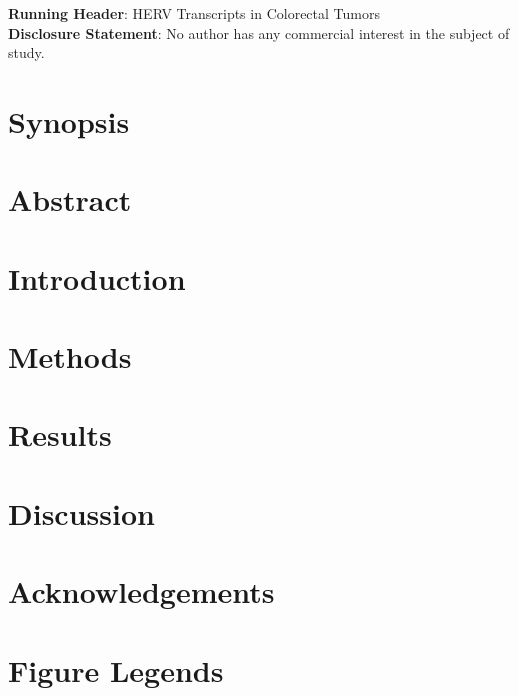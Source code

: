 \documentclass[11pt,letterpaper]{article}  %
\makeatletter
\renewcommand{\maketitle}{
        \begingroup
            \setlength{\parindent}{0pt}
            \begin{flushleft}
                \LARGE\textbf{\@title}
                \newline
                \newline
                \small\@author
            \end{flushleft}
        \endgroup
    }
\makeatother
\begin{document}
\maketitle
\small\textbf{Running Header}: HERV Transcripts in Colorectal Tumors \\
\small\textbf{Disclosure Statement}: No author has any commercial interest in the subject of study.

\newpage
\section*{Synopsis}

\newpage
\section*{Abstract}


\newpage
\section*{Introduction}


\section*{Methods}


\section*{Results}


\section*{Discussion}


\newpage
\section*{Acknowledgements}


\newpage



\newpage
\section*{Figure Legends}

\end{document}
